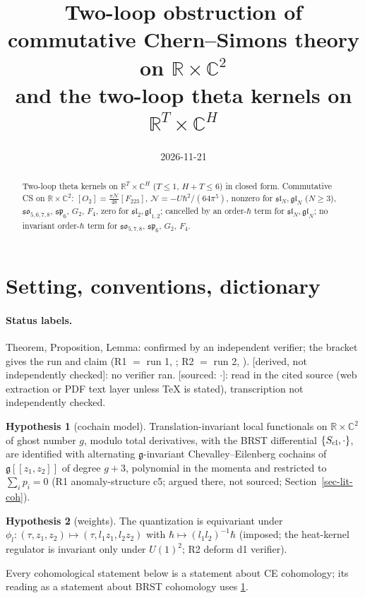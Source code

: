 \documentclass[10pt,a4paper]{article}
\title{Two-loop obstruction of commutative Chern--Simons theory on $\mathbb R\times\mathbb C^2$\\ and the two-loop theta kernels on $\mathbb R^T\times\mathbb C^H$}
\author{}
\date{2026-11-21}
\numberwithin{equation}{section}
\theoremstyle{definition}
\newtheorem{hypothesis}{Hypothesis}
\theoremstyle{remark}
\newcommand{\g}{\mathfrak g}
\newcommand{\fsl}{\mathfrak{sl}}
\newcommand{\fgl}{\mathfrak{gl}}
\newcommand{\fso}{\mathfrak{so}}
\newcommand{\fsp}{\mathfrak{sp}}
\newcommand{\cN}{\mathcal N}
\newcommand{\der}{\textup{[derived, not independently checked]}}
\newcommand{\src}[1]{\textup{[sourced: #1]}}
\begin{document}
\maketitle

\begin{abstract}
\noindent Two-loop theta kernels on $\mathbb R^T\times\mathbb C^H$ ($T\le1$, $H+T\le6$) in closed form. Commutative CS on $\mathbb R\times\mathbb C^2$: $[O_2]=\frac{\pi\cN}{48}[F_{223}]$, $\cN=-U\hbar^2/(64\pi^5)$, nonzero for $\fsl_N,\fgl_N$ ($N\ge3$), $\fso_{5,6,7,8}$, $\fsp_6$, $G_2$, $F_4$, zero for $\fsl_2,\fgl_{1,2}$; cancelled by an order-$\hbar$ term for $\fsl_N,\fgl_N$; no invariant order-$\hbar$ term for $\fso_{5,7,8}$, $\fsp_6$, $G_2$, $F_4$.
\end{abstract}

\tableofcontents

\section{Setting, conventions, dictionary}\label{sec-setting}

\paragraph{Status labels.} Theorem, Proposition, Lemma: confirmed by an independent verifier; the bracket gives the run and claim (R1 $=$ run 1, ; R2 $=$ run 2, ). \der: no verifier ran. \src{$\cdot$}: read in the cited source (web extraction or PDF text layer unless TeX is stated), transcription not independently checked.

\begin{hypothesis}[cochain model]\label{H-CE}
Translation-invariant local functionals on $\mathbb R\times\mathbb C^2$ of ghost number $g$, modulo total derivatives, with the BRST differential $\{S_{\rm cl},\cdot\}$, are identified with alternating $\g$-invariant Chevalley--Eilenberg cochains of $\g[[z_1,z_2]]$ of degree $g+3$, polynomial in the momenta and restricted to $\sum_ip_i=0$ (R1 anomaly-structure c5; argued there, not sourced; Section~\ref{sec-lit-coh}).
\end{hypothesis}
\begin{hypothesis}[weights]\label{H-w}
The quantization is equivariant under $\phi_l:(\tau,z_1,z_2)\mapsto(\tau,l_1z_1,l_2z_2)$ with $\hbar\mapsto(l_1l_2)^{-1}\hbar$ (imposed; the heat-kernel regulator is invariant only under $U(1)^2$; R2 deform d1 verifier).
\end{hypothesis}
Every cohomological statement below is a statement about CE cohomology; its reading as a statement about BRST cohomology uses \ref{H-CE}.
\end{document}
